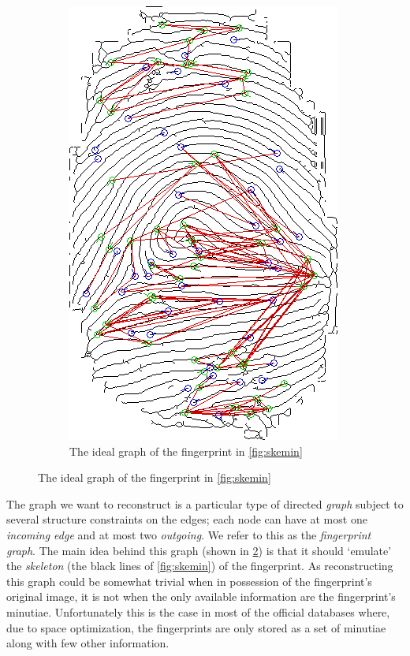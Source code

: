 \documentclass[8pt]{article}
\begin{document}
\begin{figure}
\begin{subfigure}{.48\textwidth}
	\includegraphics[width=.75\linewidth]{img/skemingraph}
	\caption{The ideal graph of the fingerprint in \cref{fig:skemin}}
	\label{fig:skemingraph}
	\end{subfigure}%
\end{figure}

The graph we want to reconstruct is a particular type of directed
\textit{graph} subject to several structure constraints on the edges; \eg each
node can have at most one \textit{incoming edge} and at most two
\textit{outgoing}.  We refer to this as the \emph{fingerprint graph}.  The main
idea behind this graph (shown in \cref{fig:skemingraph}) is that it should
\textquoteleft emulate' the \textit{skeleton} (the black lines of
\cref{fig:skemin}) of the fingerprint.  As reconstructing this graph could be
somewhat trivial when in possession of the fingerprint's original image, it is not
when the only available information are the fingerprint's minutiae.
Unfortunately this is the case in most of the official databases where, due to
space optimization, the fingerprints are only stored as a set of minutiae along
with few other information.
    
\end{document}
